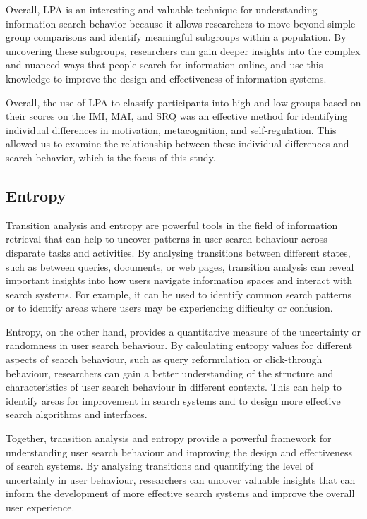 \documentclass[letterpaper, nobind]{templates/ociamthesis}
\begin{document}
Overall, LPA is an interesting and valuable technique for understanding information search behavior because it allows researchers to move beyond simple group comparisons and identify meaningful subgroups within a population. By uncovering these subgroups, researchers can gain deeper insights into the complex and nuanced ways that people search for information online, and use this knowledge to improve the design and effectiveness of information systems.

Overall, the use of LPA to classify participants into high and low groups based on their scores on the IMI, MAI, and SRQ was an effective method for identifying individual differences in motivation, metacognition, and self-regulation. This allowed us to examine the relationship between these individual differences and search behavior, which is the focus of this study.

\hypertarget{entropy}{%
\subsection{Entropy}\label{entropy}}

Transition analysis and entropy are powerful tools in the field of information retrieval that can help to uncover patterns in user search behaviour across disparate tasks and activities. By analysing transitions between different states, such as between queries, documents, or web pages, transition analysis can reveal important insights into how users navigate information spaces and interact with search systems. For example, it can be used to identify common search patterns or to identify areas where users may be experiencing difficulty or confusion.

Entropy, on the other hand, provides a quantitative measure of the uncertainty or randomness in user search behaviour. By calculating entropy values for different aspects of search behaviour, such as query reformulation or click-through behaviour, researchers can gain a better understanding of the structure and characteristics of user search behaviour in different contexts. This can help to identify areas for improvement in search systems and to design more effective search algorithms and interfaces.

Together, transition analysis and entropy provide a powerful framework for understanding user search behaviour and improving the design and effectiveness of search systems. By analysing transitions and quantifying the level of uncertainty in user behaviour, researchers can uncover valuable insights that can inform the development of more effective search systems and improve the overall user experience.
\end{document}
